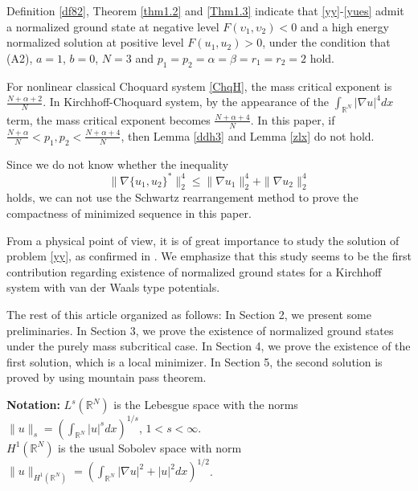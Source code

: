 \documentclass[reqno]{amsart}
\begin{document}

 \begin{remark}  \label{rmk1.1} \rm
Definition \ref{df82}, Theorem \ref{thm1.2} and \ref{Thm1.3}
indicate that \eqref{yy}-\eqref{yues} admit a normalized ground state at negative
level $F(\upsilon_1,\upsilon_2)<0$ and a high energy normalized solution at positive 
level $F(u_1,u_2)>0$, under the condition that
(A2), $a=1$, $b=0$, $N=3$ and $p_1=p_2=\alpha=\beta=r_1=r_2=2$ hold.
\end{remark}

\begin{remark} \label{rmk1.2} \rm
For nonlinear classical Choquard system \ref{ChqH}, the mass critical exponent is 
$\frac{N+\alpha+2}{N}$. In Kirchhoff-Choquard system,
by the appearance of the $\int_{\mathbb{R}^N}|\nabla u|^4dx$ term, the mass critical 
exponent becomes $\frac{N+\alpha+4}{N}$. In this
paper, if $\frac{N+\alpha}{N}<p_1,p_2<\frac{N+\alpha+4}{N}$, then Lemma 
\ref{ddh3} and Lemma \ref{zlx} do not hold.
\end{remark}

\begin{remark} \label{rmk1.3} \rm
Since we do not know whether the inequality
 \[
\| \nabla \{u_1,u_2\}^*\|_2^4\leq\| \nabla u_1\|_2^4+\| \nabla u_2\|_2^4
 \]
holds, we can not use the Schwartz rearrangement method to prove the compactness
of minimized sequence in this paper.
\end{remark}


From a physical point of view, it is of great importance to study the solution of 
 problem  \eqref{yy}, as confirmed in  \cite{VWp3,BZd27,cfrv}.
 We emphasize that this study seems to be the first contribution regarding existence 
of normalized ground states for a Kirchhoff system with van der Waals type potentials.

The rest of this article organized as follows: 
In Section 2, we present some preliminaries. 
In Section 3, we prove the existence
 of normalized ground states under the purely mass subcritical case. 
In Section 4, we prove the existence of the
 first solution, which is a local minimizer. 
In Section 5, the second solution is proved by using mountain pass theorem.
\smallskip

\noindent\textbf{Notation:} 
 $L^s(\mathbb{R}^N)$ is the Lebesgue space with the norms 
 $\| u\| _s=(\int_{\mathbb{R}^N}|u|^sdx)^{1/s}$,  $1<s<\infty$.\\
$H^1(\mathbb{R}^N)$ is the usual Sobolev space with norm 
$\| u\|_{H^1(\mathbb{R}^N)}=
 (\int_{\mathbb{R}^N}|\nabla u|^2+|u|^2dx)^{1/2}$.
\end{document}
